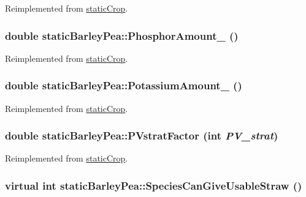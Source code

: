Reimplemented from \hyperlink{classstatic_crop_a4d3d767f569f48eb68ffa76822302467}{staticCrop}.\hypertarget{classstatic_barley_pea_a67ba0f94cf104e0a3d547f776399062f}{
\subsubsection[{PhosphorAmount\_\-}]{\setlength{\rightskip}{0pt plus 5cm}double staticBarleyPea::PhosphorAmount\_\- ()}}
\label{classstatic_barley_pea_a67ba0f94cf104e0a3d547f776399062f}


Reimplemented from \hyperlink{classstatic_crop_abaa5c59d4074d47dedc79172f8326e08}{staticCrop}.\hypertarget{classstatic_barley_pea_a0d36ad23dbbf416950d11a5c933bc029}{
\subsubsection[{PotassiumAmount\_\-}]{\setlength{\rightskip}{0pt plus 5cm}double staticBarleyPea::PotassiumAmount\_\- ()}}
\label{classstatic_barley_pea_a0d36ad23dbbf416950d11a5c933bc029}


Reimplemented from \hyperlink{classstatic_crop_a41fee98d728c7670e6acb504a9b3459d}{staticCrop}.\hypertarget{classstatic_barley_pea_a34661b51fa85b70f7178d9fc63739139}{
\subsubsection[{PVstratFactor}]{\setlength{\rightskip}{0pt plus 5cm}double staticBarleyPea::PVstratFactor (int {\em PV\_\-strat})}}
\label{classstatic_barley_pea_a34661b51fa85b70f7178d9fc63739139}


Reimplemented from \hyperlink{classstatic_crop_ae4f07498c1616eab212386faf352d348}{staticCrop}.\hypertarget{classstatic_barley_pea_a98daf5a43966b97910b34fea072f5260}{
\subsubsection[{SpeciesCanGiveUsableStraw}]{\setlength{\rightskip}{0pt plus 5cm}virtual int staticBarleyPea::SpeciesCanGiveUsableStraw ()}}
\label{classstatic_barley_pea_a98daf5a43966b97910b34fea072f5260}


